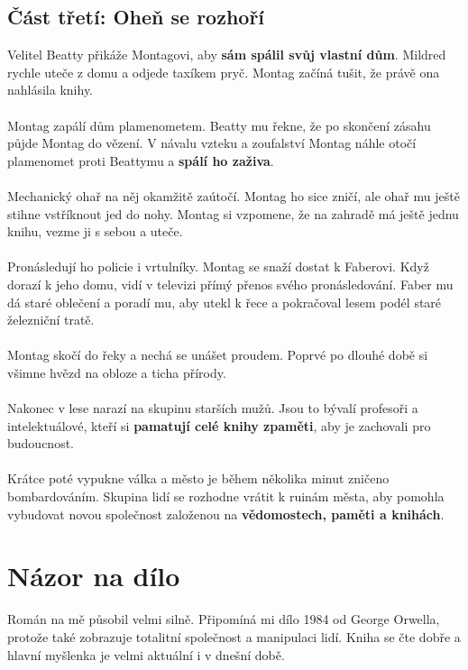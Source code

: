 \documentclass[12pt,a4paper]{article}
\begin{document}
\subsection*{Část třetí: Oheň se rozhoří}

Velitel Beatty přikáže Montagovi, aby \textbf{sám spálil svůj vlastní dům}. Mildred rychle uteče z domu a odjede taxíkem pryč. Montag začíná tušit, že právě ona nahlásila knihy.\\
\\
Montag zapálí dům plamenometem. Beatty mu řekne, že po skončení zásahu půjde Montag do vězení. V návalu vzteku a zoufalství Montag náhle otočí plamenomet proti Beattymu a \textbf{spálí ho zaživa}.\\
\\
Mechanický ohař na něj okamžitě zaútočí. Montag ho sice zničí, ale ohař mu ještě stihne vstříknout jed do nohy. Montag si vzpomene, že na zahradě má ještě jednu knihu, vezme ji s sebou a uteče.\\
\\
Pronásledují ho policie i vrtulníky. Montag se snaží dostat k Faberovi. Když dorazí k jeho domu, vidí v televizi přímý přenos svého pronásledování. Faber mu dá staré oblečení a poradí mu, aby utekl k řece a pokračoval lesem podél staré železniční tratě.\\
\\
Montag skočí do řeky a nechá se unášet proudem. Poprvé po dlouhé době si všimne hvězd na obloze a ticha přírody.\\
\\
Nakonec v lese narazí na skupinu starších mužů. Jsou to bývalí profesoři a intelektuálové, kteří si \textbf{pamatují celé knihy zpaměti}, aby je zachovali pro budoucnost.\\
\\
Krátce poté vypukne válka a město je během několika minut zničeno bombardováním. Skupina lidí se rozhodne vrátit k ruinám města, aby pomohla vybudovat novou společnost založenou na \textbf{vědomostech, paměti a knihách}.



\section*{Názor na dílo}

Román na mě působil velmi silně. Připomíná mi dílo 1984 od George Orwella, protože také zobrazuje totalitní společnost a manipulaci lidí. Kniha se čte dobře a hlavní myšlenka je velmi aktuální i v dnešní době.
\end{document}
